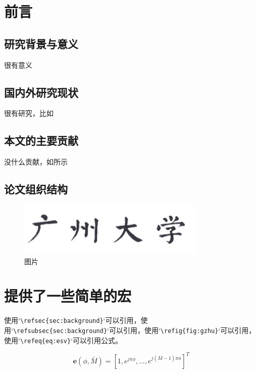 \documentclass[12pt,a4paper,AutoFakeBold]{article}
\begin{document}
\setcounter{page}{1}  
{
\mkls%
\song%

\setcounter{section}{0} %
\section{前言}
\label{sec:introduction}
\subsection{研究背景与意义}
\label{sec:background}
很有意义
\subsection{国内外研究现状}
很有研究，比如\cite{beckSurveyMetaReinforcementLearning2023}
\subsection{本文的主要贡献}
没什么贡献，如所示

\subsection{论文组织结构}

\begin{figure}[htbp] %
	\centering
	\includegraphics[width=0.8\textwidth]{assets/gzhu.png}
	\caption{图片}
	\label{fig:gzhu}
\end{figure}

\section{提供了一些简单的宏}

使用`\verb|\refsec{sec:background}|`可以引用，使用`\verb|\refsubsec{sec:background}|`可以引用，使用`\verb|\refig{fig:gzhu}|`可以引用，使用`\verb|\refeq{eq:esv}|`可以引用公式。

\begin{equation}
    \mathbf{e}(\phi,\bar{M}) = [1, e^{j \pi \phi},...,e^{j (\bar{M} - 1) \pi \phi}]^T 
    \label{eq:esv}
\end{equation}

}
\end{document}
